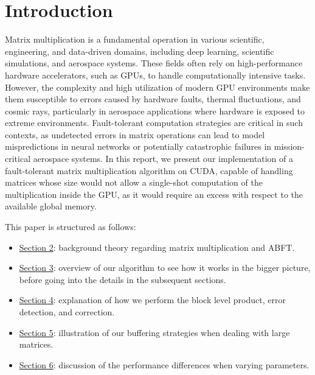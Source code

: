 \section{Introduction}

Matrix multiplication is a fundamental operation
in various scientific, engineering, and data-driven domains,
including deep learning, scientific simulations, and aerospace systems.
These fields often rely on high-performance hardware accelerators, such as GPUs,
to handle computationally intensive tasks.
However, the complexity and high utilization of modern GPU environments
make them susceptible to errors caused by hardware faults,
thermal fluctuations, and cosmic rays, particularly in aerospace applications
where hardware is exposed to extreme environments.
Fault-tolerant computation strategies are critical in such contexts,
as undetected errors in matrix operations can lead to model mispredictions
in neural networks or potentially catastrophic failures in mission-critical
aerospace systems.
In this report, we present our implementation of a fault-tolerant
matrix multiplication algorithm on CUDA, capable of handling matrices whose size would not allow a single-shot computation of the multiplication inside the GPU, as it would require an excess with respect to the available global memory.

This paper is structured as follows:
\begin{itemize}
  \item \hyperref[sec:background]{Section 2}: background theory regarding matrix multiplication and ABFT.
  \item \hyperref[sec:overview]{Section 3}: overview of our algorithm to see how it works in the bigger picture, before going into the details in the subsequent sections.
  \item \hyperref[sec:block]{Section 4}: explanation of how we perform the block level product, error detection, and correction.
  \item \hyperref[sec:strategies]{Section 5}: illustration of our buffering strategies when dealing with large matrices.
  \item \hyperref[sec:results]{Section 6}: discussion of the performance differences when varying parameters.
\end{itemize}
